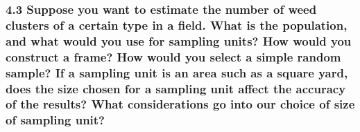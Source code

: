 \documentclass[
]{article}
\begin{document}
\hypertarget{suppose-you-want-to-estimate-the-number-of-weed-clusters-of-a-certain-type-in-a-field.-what-is-the-population-and-what-would-you-use-for-sampling-units-how-would-you-construct-a-frame-how-would-you-select-a-simple-random-sample-if-a-sampling-unit-is-an-area-such-as-a-square-yard-does-the-size-chosen-for-a-sampling-unit-affect-the-accuracy-of-the-results-what-considerations-go-into-our-choice-of-size-of-sampling-unit}{%
\subsubsection{4.3 Suppose you want to estimate the number of weed
clusters of a certain type in a field. What is the population, and what
would you use for sampling units? How would you construct a frame? How
would you select a simple random sample? If a sampling unit is an area
such as a square yard, does the size chosen for a sampling unit affect
the accuracy of the results? What considerations go into our choice of
size of sampling
unit?}\label{suppose-you-want-to-estimate-the-number-of-weed-clusters-of-a-certain-type-in-a-field.-what-is-the-population-and-what-would-you-use-for-sampling-units-how-would-you-construct-a-frame-how-would-you-select-a-simple-random-sample-if-a-sampling-unit-is-an-area-such-as-a-square-yard-does-the-size-chosen-for-a-sampling-unit-affect-the-accuracy-of-the-results-what-considerations-go-into-our-choice-of-size-of-sampling-unit}}
\end{document}
